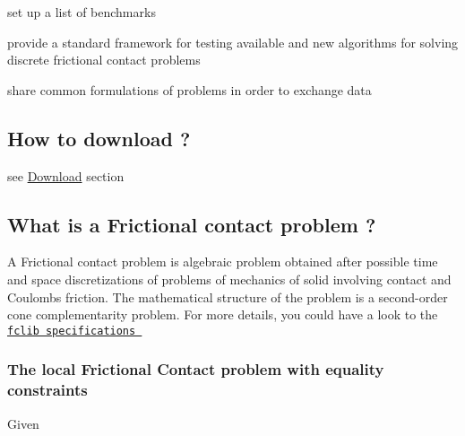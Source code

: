 \begin{DoxyItemize}
\item set up a list of benchmarks  
\item provide a standard framework for testing available and new algorithms for solving discrete frictional contact problems  
\item share common formulations of problems in order to exchange data 
\end{DoxyItemize}\hypertarget{index_howtodownload}{}\subsection{How to download  ?}\label{index_howtodownload}
see \hyperlink{download}{Download} section\hypertarget{index_Wahtis}{}\subsection{What is a Frictional contact problem ?}\label{index_Wahtis}
A Frictional contact problem is algebraic problem obtained after possible time and space discretizations of problems of mechanics of solid involving contact and Coulomb\textquotesingle{}s friction. The mathematical structure of the problem is a second-\/order cone complementarity problem. For more details, you could have a look to the \href{doc/FCLib.pdf}{\tt fclib specifications }\hypertarget{index_Localfclib}{}\subsubsection{The local Frictional Contact problem with equality constraints}\label{index_Localfclib}
Given 
